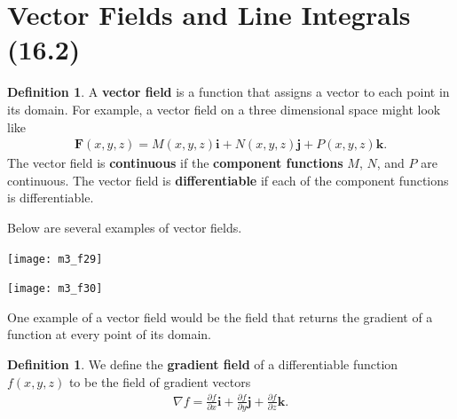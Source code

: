 \documentclass[12pt, letter]{article}
\theoremstyle{plain}
\numberwithin{theorem}{section}
\theoremstyle{definition}
\newtheorem{definition}[theorem]{Definition}
\begin{document}
\newpage


\section{Vector Fields and Line Integrals (16.2)}

\begin{definition}
A \textbf{vector field} is a function that assigns a vector to each point in its domain. For example, a vector field on a three dimensional space might look like
\begin{align*}
\bm{F}(x,y,z) = M(x,y,z)\bm{i} + N(x,y,z)\bm{j}+P(x,y,z)\bm{k}.
\end{align*}
The vector field is \textbf{continuous} if the \textbf{component functions} $M$, $N$, and $P$ are continuous. The vector field is \textbf{differentiable} if each of the component functions is differentiable.
\end{definition}

\bigskip

\hrulefill

\bigskip

Below are several examples of vector fields.

\bigskip

\begin{center}
\texttt{[image: m3\_f29]}
\end{center}

\bigskip

\begin{center}
\texttt{[image: m3\_f30]}
\end{center}

\bigskip

\hrulefill

\bigskip

One example of a vector field would be the field that returns the gradient of a function at every point of its domain. 

\bigskip

\begin{definition}
We define the \textbf{gradient field} of a differentiable function $f(x,y,z)$ to be the field of gradient vectors
\begin{align*}
\nabla f = \frac{\partial f}{\partial x} \bm{i} + \frac{\partial f}{\partial y} \bm{j} + \frac{\partial f}{\partial z} \bm{k}.
\end{align*}
\end{definition}
\end{document}
